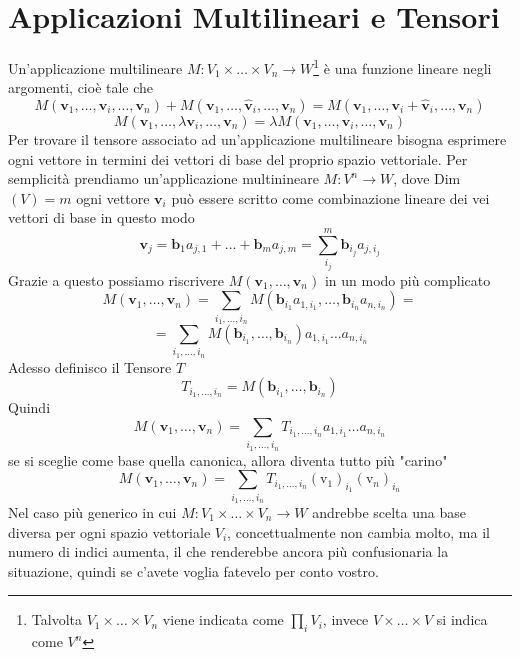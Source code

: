 \documentclass[11pt,a4paper]{report}
\newcommand{\vettore}[1]{\mathbf{#1}}
\newcommand{\vettorec}[1]{\textrm{#1}}
\theoremstyle{definition}
\theoremstyle{plain}
\theoremstyle{plain}
\begin{document}
		\section{Applicazioni Multilineari e Tensori}
			Un'applicazione multilineare $M:V_1\times\dots\times V_n\rightarrow W$\footnote{Talvolta $V_1\times\dots\times V_n$ viene indicata come $\prod_i V_i$, invece $V\times\dots\times V$ si indica come $V^n$} è una funzione lineare negli argomenti, cioè tale che
			\[
				M(\vettore v_1,\dots,\vettore v_i,\dots,\vettore v_n)+M(\vettore v_1,\dots,\vettore{\hat v}_i,\dots,\vettore v_n)=
				M(\vettore v_1,\dots,\vettore v_i+\vettore{\hat v}_i,\dots,\vettore v_n)
			\]
			\begin{equation}
				M(\vettore v_1,\dots,\lambda \vettore v_i,\dots,\vettore v_n)=
				\lambda M(\vettore v_1,\dots,\vettore v_i,\dots,\vettore v_n)
			\end{equation}
			Per trovare il tensore associato ad un'applicazione multilineare bisogna esprimere ogni vettore in termini dei vettori di base del proprio spazio vettoriale.\newline
			Per semplicità prendiamo un'applicazione multinineare $M:V^n\rightarrow W$, dove Dim$(V)=m$\newline
			ogni vettore $\vettore v_i$ può essere scritto come combinazione lineare dei vei vettori di base in questo modo 
			\[
				\vettore v_j=\vettore b_1 a_{j,1}+\dots +\vettore b_m a_{j,m}=\sum_{i_j}^m\vettore b_{i_j}a_{j,i_j}
			\]
			Grazie a questo possiamo riscrivere $M(\vettore v_1,\dots,\vettore v_n)$ in un modo più complicato\newline
			\[
				M(\vettore v_1,\dots,\vettore v_n)=
				\sum_{i_1,\dots,i_n}M(\vettore b_{i_1}  a_{1,{i_1}},\dots,\vettore b_{i_n} a_{n,{i_n}})=
			\]
			\[
				=\sum_{i_1,\dots,i_n}M(\vettore b_{i_1},\dots,\vettore b_{i_n})a_{1,{i_1}}\dots a_{n,{i_n}}
			\]
			Adesso definisco il Tensore $T$
			\begin{equation}
				T_{i_1,\dots,i_n}=M(\vettore b_{i_1},\dots,\vettore b_{i_n})
			\end{equation}
			Quindi
			\begin{equation}
				M(\vettore v_1,\dots,\vettore v_n)=\sum_{i_1,\dots,i_n}T_{i_1,\dots,i_n}a_{1,{i_1}}\dots a_{n,{i_n}}
			\end{equation}
			se si sceglie come base quella canonica, allora diventa tutto più "carino"
			\[
				M(\vettore v_1,\dots,\vettore v_n)=\sum_{i_1,\dots,i_n}T_{i_1,\dots,i_n}
				(\vettorec v_1)_{i_1}(\vettorec v_n)_{i_n}	
			\]
			Nel caso più generico in cui $M:V_1\times\dots\times V_n\rightarrow W$ andrebbe scelta una base diversa per ogni spazio vettoriale $V_i$, concettualmente non cambia molto, ma il numero di indici aumenta, il che renderebbe ancora più confusionaria la situazione, quindi se c'avete voglia fatevelo per conto vostro.
\end{document}
